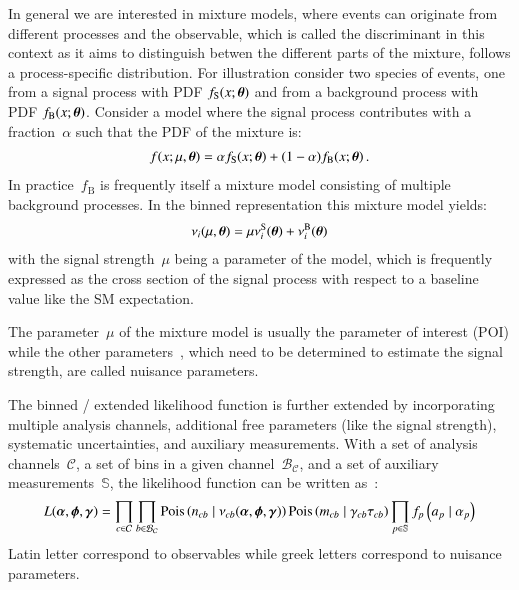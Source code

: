 
In general we are interested in mixture models, where events can
originate from different processes and the observable, which is called
the discriminant in this context as it aims to distinguish betwen the
different parts of the mixture, follows a process-specific
distribution. For illustration consider two species of events, one
from a signal process with PDF $f_\text{S}(x; \boldsymbol{\theta})$ and from a
background process with PDF $f_\text{B}(x; \boldsymbol{\theta})$. Consider a
model where the signal process contributes with a fraction~$\alpha$
such that the PDF of the mixture is:
\begin{align*}
  f(x; \mu, \boldsymbol{\theta}) = \alpha f_\text{S}(x; \boldsymbol{\theta}) + (1 - \alpha) f_\text{B}(x; \boldsymbol{\theta}) \,\text{.}
\end{align*}
In practice~$f_\text{B}$ is frequently itself a mixture model
consisting of multiple background processes. In the binned
representation this mixture model yields:
\begin{align*}
  \nu_i(\mu, \boldsymbol{\theta}) = \mu \nu_i^\text{S}(\boldsymbol{\theta}) + \nu_i^\text{B}(\boldsymbol{\theta})
\end{align*}
with the signal strength~$\mu$ being a parameter of the model, which
is frequently expressed as the cross section of the signal process
with respect to a baseline value like the SM expectation.

The parameter~$\mu$ of the mixture model is usually the parameter of
interest (POI) while the other parameters~\boldtheta, which need to be
determined to estimate the signal strength, are called nuisance
parameters.


The binned / extended likelihood function is further extended by
incorporating multiple analysis channels, additional free parameters
(like the signal strength), systematic uncertainties, and auxiliary
measurements. With a set of analysis channels~$\mathcal{C}$, a set of
bins in a given channel~$\mathcal{B}_\mathcal{C}$, and a set of
auxiliary measurements~$\mathbb{S}$, the likelihood function can be
written as~\cite{cranmer2012}:
\begin{align*}
  L(\boldsymbol{\alpha}, \boldsymbol{\phi}, \boldsymbol{\gamma}) =
  \prod_{c \in \mathcal{C}} \prod_{b \in \mathcal{B}_{\mathcal{C}}}
  \mathrm{Pois}\left( n_{cb} \mid \nu_{cb}(\boldsymbol{\alpha}, \boldsymbol{\phi}, \boldsymbol{\gamma}) \right)
  \mathrm{Pois}\left(m_{cb} \mid  \gamma_{cb} \tau_{cb} \right)
  \prod_{p \in \mathbb{S}} f_p\left(a_p \mid \alpha_p \right)
\end{align*}
Latin letter correspond to observables while greek letters correspond
to nuisance parameters.

